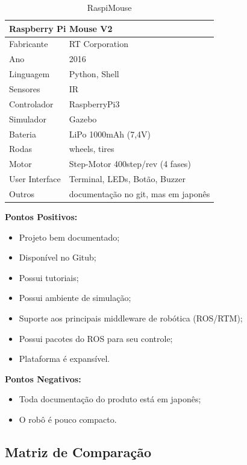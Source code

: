 \begin{table}[]
	\centering
	\begin{tabular}{|l|l|}
		\hline
		\multicolumn{2}{|l|}{\textbf{Raspberry Pi Mouse V2}} \\ \hline
		Fabricante & RT Corporation \\ \hline
		Ano & 2016 \\ \hline
		Linguagem & Python, Shell \\ \hline
		Sensores & IR \\ \hline
		Controlador & RaspberryPi3 \\ \hline
		Simulador & Gazebo \\ \hline
		Bateria & LiPo 1000mAh (7,4V) \\ \hline
		Rodas & wheels, tires \\ \hline
		Motor & Step-Motor 400step/rev (4 fases) \\ \hline
		User Interface & Terminal, LEDs, Botão, Buzzer \\ \hline
		Outros & documentação no git, mas em japonês \\ \hline
	\end{tabular}
	\caption{\label{tab:RaspiMouse} RaspiMouse}
\end{table}

\textbf{Pontos Positivos:}
\begin{itemize}
	\item Projeto bem documentado;
	\item Disponível no Gitub;
	\item Possui tutoriais;
	\item Possui ambiente de simulação;
	\item Suporte aos principais middleware de robótica (ROS/RTM);
	\item Possui pacotes do ROS para seu controle;
	\item Plataforma é expansível.
\end{itemize}

\textbf{Pontos Negativos:}
\begin{itemize}
	\item Toda documentação do produto está em japonês;
	\item O robô é pouco compacto.
\end{itemize}

\subsection{Matriz de Comparação}

